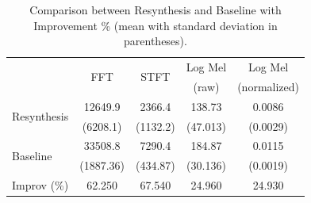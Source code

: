 \documentclass[10pt,conference]{IEEEtran}
\begin{document}
\begin{table}[htb] \small %
  \caption{Comparison between Resynthesis and Baseline with Improvement \% (mean with standard deviation in parentheses).}
  \label{tab:metrics}
\begin{tabular*}{\columnwidth}
	{@{\extracolsep{\fill}}lcccc}
        \toprule
        & \multirow{2}{*}{FFT} & \multirow{2}{*}{STFT} & Log Mel & Log Mel \\ 
        & & & (raw) & (normalized) \\
        
        \midrule
        \multirow{2}{*}{Resynthesis} & 12649.9 & 2366.4 & 138.73 & 0.0086 \\
        & (6208.1) & (1132.2) & (47.013) & (0.0029) \\ 
        \multirow{2}{*}{Baseline} & 33508.8 & 7290.4 & 184.87 & 0.0115 \\
        & (1887.36) & (434.87) & (30.136) & (0.0019) \\
        \midrule
        Improv (\%) & 62.250 & 67.540 & 24.960 & 24.930 \\
        \bottomrule
    \end{tabular*}
\end{table}


\end{document}
